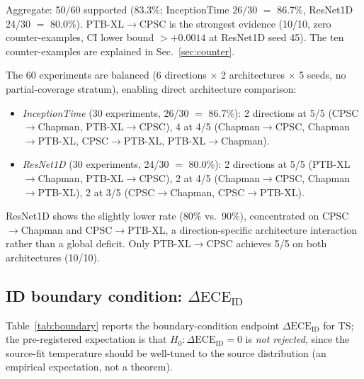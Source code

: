 \documentclass[review,12pt,nonatbib]{elsarticle}
\begin{document}
Aggregate: 50/60 supported (83.3\%; InceptionTime 26/30 $=$
86.7\%, ResNet1D 24/30 $=$ 80.0\%). PTB-XL$\rightarrow$CPSC is the
strongest evidence (10/10, zero counter-examples, CI lower bound
$> +0.0014$ at ResNet1D seed 45). The ten counter-examples are
explained in Sec.~\ref{sec:counter}.

The 60 experiments are
balanced (6 directions $\times$ 2 architectures $\times$ 5 seeds, no
partial-coverage stratum), enabling direct architecture comparison:
\begin{itemize}
    \item \emph{InceptionTime} (30 experiments, 26/30 $=$ 86.7\%):
    2 directions at 5/5 (CPSC$\rightarrow$Chapman,
    PTB-XL$\rightarrow$CPSC), 4 at 4/5
    (Chapman$\rightarrow$CPSC, Chapman$\rightarrow$PTB-XL,
    CPSC$\rightarrow$PTB-XL, PTB-XL$\rightarrow$Chapman).
    \item \emph{ResNet1D} (30 experiments, 24/30 $=$ 80.0\%):
    2 directions at 5/5 (PTB-XL$\rightarrow$Chapman,
    PTB-XL$\rightarrow$CPSC), 2 at 4/5 (Chapman$\rightarrow$CPSC,
    Chapman$\rightarrow$PTB-XL), 2 at 3/5 (CPSC$\rightarrow$Chapman,
    CPSC$\rightarrow$PTB-XL).
\end{itemize}
ResNet1D shows the slightly lower rate (80\% vs.\ 90\%), concentrated
on CPSC$\rightarrow$Chapman and CPSC$\rightarrow$PTB-XL, a
direction-specific architecture interaction rather than a global
deficit. Only PTB-XL$\rightarrow$CPSC achieves 5/5 on both
architectures (10/10).

\subsection{ID boundary condition: $\Delta\text{ECE}_{\text{ID}}$}
\label{sec:boundary}
Table~\ref{tab:boundary} reports the boundary-condition endpoint
$\Delta\text{ECE}_{\text{ID}}$ for TS; the pre-registered expectation is
that $H_0:\Delta\text{ECE}_{\text{ID}}=0$ is \emph{not rejected}, since
the source-fit temperature should be well-tuned to the source
distribution (an empirical expectation, not a theorem).
\end{document}
